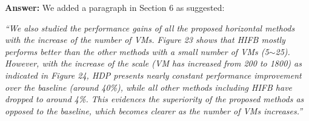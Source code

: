 \documentclass{letter}
\newcommand{\answer}[1]{%
      \textbf{Answer:} #1}
\newcommand{\revised}[1]{\emph{#1}\color{black}}
\begin{document}
\begin{letter}{}
\answer{We added a paragraph in Section 6 as suggested:}

\revised{``We also studied the performance gains of all the proposed horizontal methods with the increase of the number of VMs. Figure 23 shows that HIFB mostly performs better than the other methods with a small number of VMs (5$\sim$25).  However, with the increase of the scale (VM has increased from 200 to 1800) as indicated in Figure 24, HDP presents nearly constant performance improvement over the baseline (around 40\%), while all other methods including HIFB have dropped to around 4\%.  This evidences the superiority of the proposed
methods as opposed to the baseline, which becomes clearer as the number of VMs increases.''}



\end{letter}
\end{document}
